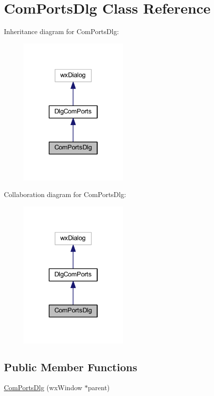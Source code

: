 \hypertarget{class_com_ports_dlg}{\section{Com\-Ports\-Dlg Class Reference}
\label{class_com_ports_dlg}
}


Inheritance diagram for Com\-Ports\-Dlg\-:\nopagebreak
\begin{figure}[H]
\begin{center}
\leavevmode
\includegraphics[width=154pt]{class_com_ports_dlg__inherit__graph}
\end{center}
\end{figure}


Collaboration diagram for Com\-Ports\-Dlg\-:\nopagebreak
\begin{figure}[H]
\begin{center}
\leavevmode
\includegraphics[width=154pt]{class_com_ports_dlg__coll__graph}
\end{center}
\end{figure}
\subsection*{Public Member Functions}
\begin{DoxyCompactItemize}
\item 
\hyperlink{class_com_ports_dlg_a02f8415185ed657f0263ae795e2b4f04}{Com\-Ports\-Dlg} (wx\-Window $\ast$parent)
\end{DoxyCompactItemize}
